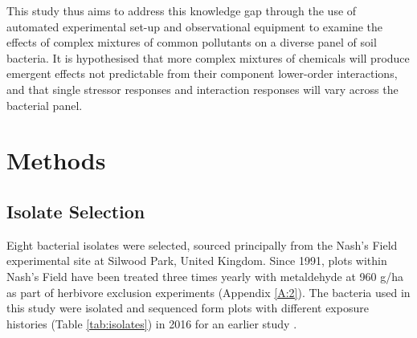 \documentclass[final,1p,times]{elsarticle}
\begin{document}
This study thus aims to address this knowledge gap through the use of automated experimental set-up and observational equipment to examine the effects of complex mixtures of common pollutants on a diverse panel of soil bacteria. It is hypothesised that more complex mixtures of chemicals will produce emergent effects not predictable from their component lower-order interactions, and that single stressor responses and interaction responses will vary across the bacterial panel.

\section{Methods}
\label{S:2}
\subsection{Isolate Selection}
\label{S:2:1}

Eight bacterial isolates were selected, sourced principally from the Nash's Field experimental site at Silwood Park, United Kingdom. Since 1991, plots within Nash's Field have been treated three times yearly with metaldehyde at 960 g/ha as part of herbivore exclusion experiments \cite{Allan2011ContrastingExperiment} (Appendix \ref{A:2}). The bacteria used in this study were isolated and sequenced form plots with different exposure histories (Table \ref{tab:isolates}) in 2016 for an earlier study \cite{Mombrikotb2016}. 
\end{document}
